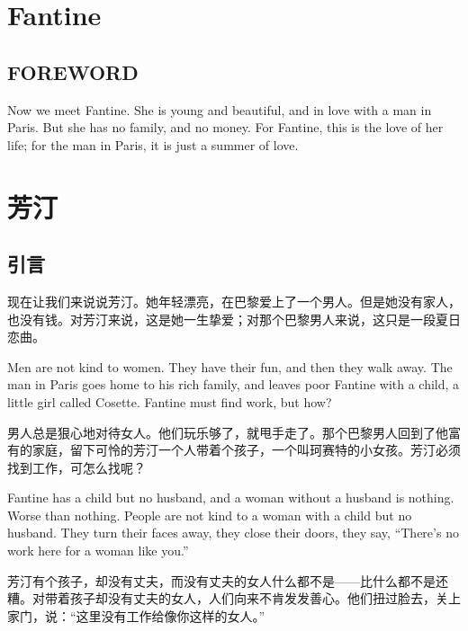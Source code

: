 \documentclass[fontset=ubuntu, zihao=5]{ctexart}
\begin{document}
\clearpage
\begin{paracol}{2}

  \section{Fantine}

  \subsection*{FOREWORD}

  Now we meet Fantine. She is young and beautiful, and in love with a man in Paris. But she has no family, and no money. For Fantine, this is the love of her life; for the man in Paris, it is just a summer of love.

  \switchcolumn

  \section*{芳汀}

  \subsection*{引言}


  现在让我们来说说芳汀。她年轻漂亮，在巴黎爱上了一个男人。但是她没有家人，也没有钱。对芳汀来说，这是她一生挚爱；对那个巴黎男人来说，这只是一段夏日恋曲。

  \switchcolumn*

  Men are not kind to women. They have their fun, and then they walk away. The man in Paris goes home to his rich family, and leaves poor Fantine with a child, a little girl called Cosette. Fantine must find work, but how?

  \switchcolumn

  男人总是狠心地对待女人。他们玩乐够了，就甩手走了。那个巴黎男人回到了他富有的家庭，留下可怜的芳汀一个人带着个孩子，一个叫珂赛特的小女孩。芳汀必须找到工作，可怎么找呢？

  \switchcolumn*

  Fantine has a child but no husband, and a woman without a husband is nothing. Worse than nothing. People are not kind to a woman with a child but no husband. They turn their faces away, they close their doors, they say, ``There's no work here for a woman like you.''

  \switchcolumn

  芳汀有个孩子，却没有丈夫，而没有丈夫的女人什么都不是——比什么都不是还糟。对带着孩子却没有丈夫的女人，人们向来不肯发发善心。他们扭过脸去，关上家门，说：“这里没有工作给像你这样的女人。”


\end{paracol}
\end{document}

